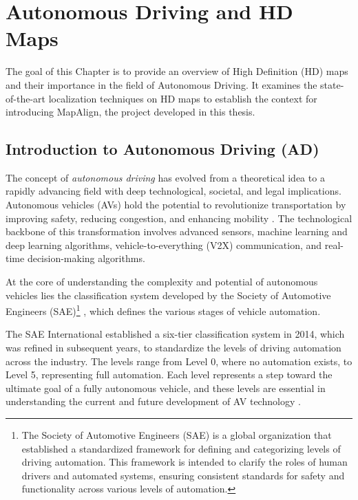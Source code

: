 \chapter{Autonomous Driving and HD Maps}
The goal of this Chapter is to provide an overview of High Definition (HD) maps and their importance in the field of Autonomous Driving. It examines the state-of-the-art localization techniques on HD maps to establish the context for introducing MapAlign, the project developed in this thesis.

\section{Introduction to Autonomous Driving (AD)}
The concept of \textit{autonomous driving} has evolved from a theoretical idea to a rapidly advancing field with deep technological, societal, and legal implications. Autonomous vehicles (AVs) hold the potential to revolutionize transportation by improving safety, reducing congestion, and enhancing mobility \cite{9695620}. The technological backbone of this transformation involves advanced sensors, machine learning and deep learning algorithms, vehicle-to-everything (V2X) communication, and real-time decision-making algorithms.

At the core of understanding the complexity and potential of autonomous vehicles lies the classification system developed by the Society of Automotive Engineers (SAE)\footnote{The Society of Automotive Engineers (SAE) is a global organization that established a standardized framework for defining and categorizing levels of driving automation. This framework is intended to clarify the roles of human drivers and automated systems, ensuring consistent standards for safety and functionality across various levels of automation.} \cite{SAE_J3016_202104}, which defines the various stages of vehicle automation.

The SAE International established a six-tier classification system in 2014, which was refined in subsequent years, to standardize the levels of driving automation across the industry. The levels range from Level 0, where no automation exists, to Level 5, representing full automation. Each level represents a step toward the ultimate goal of a fully autonomous vehicle, and these levels are essential in understanding the current and future development of AV technology \cite{9881892}.

